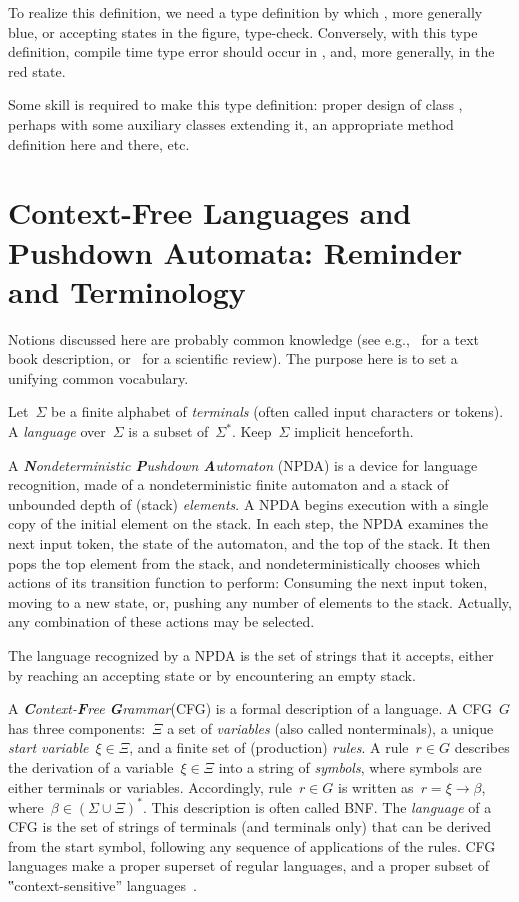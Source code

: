 \documentclass[a4paper,USenglish]{lipics-v2016}
\newcommand\kk[1]{\textcolor{RoyalBlue}{\text{\textup{\textbf{\texttt{#1}}}}}}
\newcommand\cc[1]{\textcolor{Sepia}{\text{\textup{\textbf{\texttt{#1}}}}}}
\numberwithin{equation}{section}
\numberwithin{figure}{section}
\begin{document}
To realize this definition, we need a type definition by which \cc{\kk{new} Box().open().close()}, more generally
  blue, or accepting states in the figure, type-check.
Conversely, with this type definition, compile time type error should occur in \cc{\kk{new} Box().close()},
  and, more generally, in the red state.

Some skill is required to make this type definition: proper design of class \cc{Box}, perhaps with
  some auxiliary classes extending it, an appropriate method definition here and there, etc.
 
\section{Context-Free Languages and Pushdown Automata: Reminder and Terminology}
\label{section:pushdown}
Notions discussed here are probably common knowledge
 (see e.g.,~\cite{Hopcroft:Ullman:01,Linz:2001} for a text book description,
 or~\cite{Autebert:97} for a scientific review).
The purpose here is to set a unifying common vocabulary.

Let~$Σ$ be a finite alphabet of \emph{terminals} (often called input characters or tokens).
A \emph{language} over~$Σ$
  is a subset of~$Σ^*$.
Keep~$Σ$ implicit henceforth.

A \emph{\textbf Nondeterministic \textbf Pushdown \textbf Automaton} (NPDA) is a device for language recognition,
  made of a nondeterministic finite automaton
  and a stack of unbounded depth of (stack) \emph{elements}.
A NPDA begins execution with a single copy of the initial element on the stack.
In each step, the NPDA
  examines the next input token,
  the state of the automaton,
  and the top of the stack.
It then pops the top element from the stack, and nondeterministically chooses which actions of
  its transition function to perform:
  Consuming the next input token,
  moving to a new state,
  or, pushing any number of elements to the stack.
Actually, any combination of these actions may be selected.

The language recognized by a NPDA is the set of strings that it accepts,
  either by reaching an accepting state or by encountering an empty stack.

A \emph{\textbf Context-\textbf Free \textbf Grammar}(CFG) is a formal description of a language.
A CFG~$G$ has three components:~$Ξ$ a set of \emph{variables} (also called nonterminals),
  a unique \emph{start variable}~$ξ∈Ξ$, and a finite set of (production) \emph{rules}.
A rule~$r∈G$ describes the derivation of a variable~$ξ∈Ξ$ into
  a string of \emph{symbols}, where symbols are either terminals or variables.
Accordingly, rule~$r∈G$ is written as~$r=ξ→β$, where~$β∈\left(Σ∪Ξ\right)^*$.
This description is often called BNF\@.
The \emph{language} of a CFG is the set of strings of terminals (and terminals only)
  that can be derived from the start symbol, following any sequence of applications of the rules.
CFG languages make a proper superset of regular languages, and a proper subset of 
  ‟context-sensitive” languages~\cite{Hopcroft:Ullman:01}.
\end{document}
